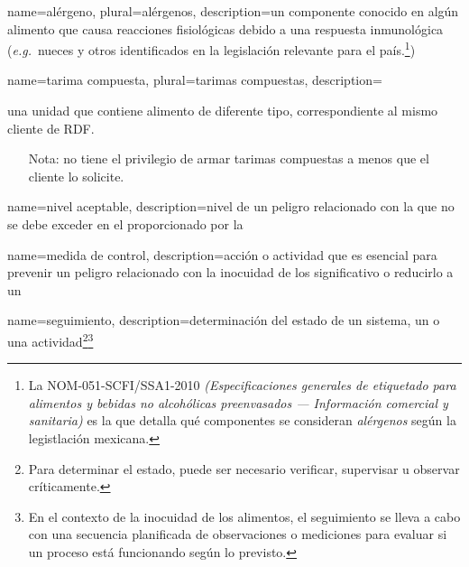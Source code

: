 {
    name={alérgeno},
    plural={alérgenos},
    description={un componente conocido en algún alimento que causa reacciones fisiológicas debido a una respuesta inmunológica (\textit{e.g.}\ nueces y otros identificados en la legislación relevante para el país.\footnote{La NOM-051-SCFI/SSA1-2010 \textit{(Especificaciones generales de etiquetado para alimentos y bebidas no alcohólicas preenvasados --- Información comercial y sanitaria)} es la que detalla qué componentes se consideran \emph{alérgenos} según la legistlación mexicana.})}
}

{
    name={tarima compuesta},
    plural={tarimas compuestas},
    description={%
    una unidad que contiene alimento de diferente tipo, correspondiente al mismo cliente de RDF.
    \begin{itemize}
        \item[Nota:]  no tiene el privilegio de armar tarimas compuestas a menos que el cliente lo solicite.
    \end{itemize}}
}

{
    name={nivel aceptable},
    description={nivel de un peligro relacionado con la  que no se debe exceder en el  proporcionado por la }
}

{
    name={medida de control},
    description={acción o actividad que es esencial para prevenir un peligro relacionado con la inocuidad de los   significativo o reducirlo a un }
}

{
    name={seguimiento},
    description={determinación del estado de un sistema, un  o una actividad\footnote{Para determinar el estado, puede ser necesario verificar, supervisar u observar críticamente.}\footnote{En el contexto de la inocuidad de los alimentos, el seguimiento se lleva a cabo con una secuencia planificada de observaciones o mediciones para evaluar si un proceso está funcionando según lo previsto.}}
}


